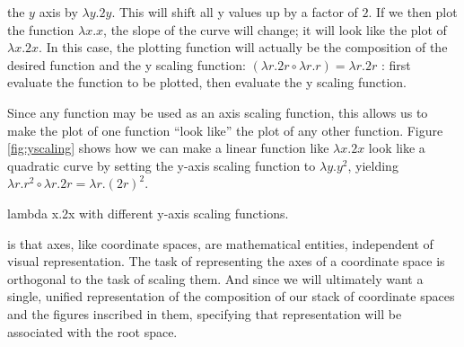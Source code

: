 \documentclass[12pt]{tufte-handout}
\numberwithin{equation}{subsection}
\numberwithin{equation}{subsection}
\begin{document}
   the \(y\) axis by \(\lambda y.2y\).
  This will shift all y values up by a factor of \(2\).  If we then plot
  the function \(\lambda x.x\), the slope of the curve will change; it
  will look like the plot of \(\lambda x.2x\).  In this case, the
  plotting function will actually be the composition of the desired
  function and the y scaling function: \((\lambda r.2r\circ\lambda r.r)
  = \lambda r.2r\)%
  : first evaluate the function to be plotted, then
  evaluate the y scaling function.

  Since any function may be used as an axis scaling function, this
  allows us to make the plot of one function ``look like'' the plot of
  any other function.  Figure \ref{fig:yscaling} shows how we can make a
  linear function like \(\lambda x.2x\) look like a quadratic curve by setting the y-axis
  scaling function to \(\lambda y.y^2\), yielding \(\lambda
  r.r^2\circ\lambda r.2r = \lambda r.(2r)^2\).

  \begin{marginfigure}[12pt]%
    \hspace{8pt}
    \vspace{12pt}
    \caption{lambda x.2x with different y-axis scaling functions.}
    \label{fig:yscaling}
  \end{marginfigure}%

   is that axes, like coordinate
  spaces, are mathematical entities, independent of visual
  representation.  The task of representing the axes of a coordinate
  space is orthogonal to the task of scaling them.  And since we will
  ultimately want a single, unified representation of the composition of
  our stack of coordinate spaces and the figures inscribed in them,
  specifying that representation will be associated with the root
  space.
\end{document}

